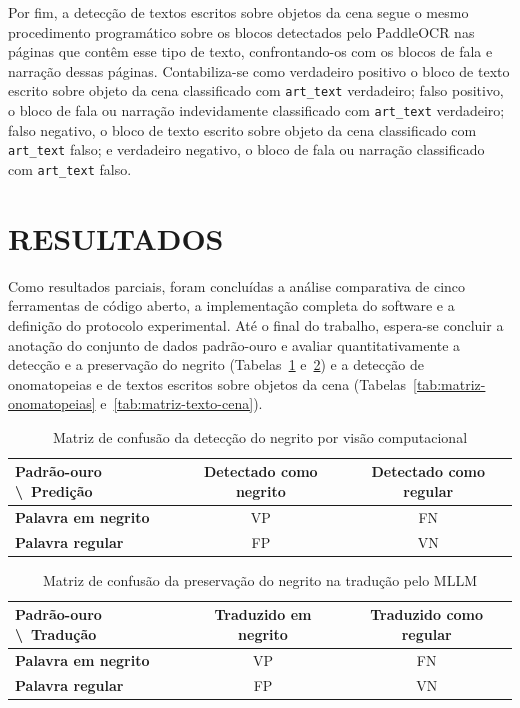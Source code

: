 \documentclass[
    12pt,
    openright,
    oneside,
    a4paper,
    chapter=TITLE,
    section=TITLE,
    english,
    brazilian,
    brazil
]{abntex2}
\renewcommand{\footnotesize}{\fontsize{10pt}{12pt}\selectfont}
\begin{document}
Por fim, a detecção de textos escritos sobre objetos da cena segue o mesmo procedimento programático sobre os blocos detectados pelo PaddleOCR nas páginas que contêm esse tipo de texto, confrontando-os com os blocos de fala e narração dessas páginas. Contabiliza-se como verdadeiro positivo o bloco de texto escrito sobre objeto da cena classificado com \texttt{art\_text} verdadeiro; falso positivo, o bloco de fala ou narração indevidamente classificado com \texttt{art\_text} verdadeiro; falso negativo, o bloco de texto escrito sobre objeto da cena classificado com \texttt{art\_text} falso; e verdadeiro negativo, o bloco de fala ou narração classificado com \texttt{art\_text} falso.

\section{RESULTADOS}
\label{sec:resultados}

Como resultados parciais, foram concluídas a análise comparativa de cinco ferramentas de código aberto, a implementação completa do software e a definição do protocolo experimental. Até o final do trabalho, espera-se concluir a anotação do conjunto de dados padrão-ouro e avaliar quantitativamente a detecção e a preservação do negrito (Tabelas~\ref{tab:matriz-deteccao-negrito} e~\ref{tab:matriz-preservacao-negrito}) e a detecção de onomatopeias e de textos escritos sobre objetos da cena (Tabelas~\ref{tab:matriz-onomatopeias} e~\ref{tab:matriz-texto-cena}).

\begin{table}[htb]
    \caption{Matriz de confusão da detecção do negrito por visão computacional}
    \label{tab:matriz-deteccao-negrito}
    \centering
    \footnotesize
    \renewcommand{\arraystretch}{1.25}
    \begin{tabular}{|l|c|c|}
        \hline
        \textbf{Padrão-ouro \textbackslash\ Predição} & \textbf{Detectado como negrito} & \textbf{Detectado como regular} \\
        \hline
        \textbf{Palavra em negrito} & VP & FN \\
        \hline
        \textbf{Palavra regular} & FP & VN \\
        \hline
    \end{tabular}
\end{table}

\begin{table}[htb]
    \caption{Matriz de confusão da preservação do negrito na tradução pelo MLLM}
    \label{tab:matriz-preservacao-negrito}
    \centering
    \footnotesize
    \renewcommand{\arraystretch}{1.25}
    \begin{tabular}{|l|c|c|}
        \hline
        \textbf{Padrão-ouro \textbackslash\ Tradução} & \textbf{Traduzido em negrito} & \textbf{Traduzido como regular} \\
        \hline
        \textbf{Palavra em negrito} & VP & FN \\
        \hline
        \textbf{Palavra regular} & FP & VN \\
        \hline
    \end{tabular}
\end{table}
\end{document}
